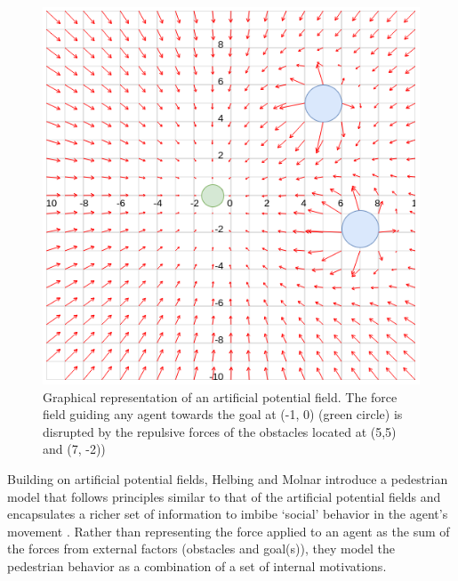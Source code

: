 \begin{figure}
	\centering
	\includegraphics[width=\linewidth]{figures/vector_field_pf.png}
	\caption{Graphical representation of an artificial potential field. The force field guiding any agent  towards the goal at (-1, 0) (green circle) is disrupted by the repulsive forces of the obstacles located at (5,5) and (7, -2))}
	\label{fig:artificial_pf}
\end{figure}
Building on artificial potential fields, Helbing and Molnar introduce a pedestrian model that follows principles similar to that of the artificial potential fields and encapsulates a richer set of information to imbibe `social' behavior in the agent's movement \cite{helbing_social_1998}. Rather than representing the force applied to an agent as the sum of the forces from external factors (obstacles and goal(s)), they model the pedestrian behavior as a combination of a set of internal motivations.\\

